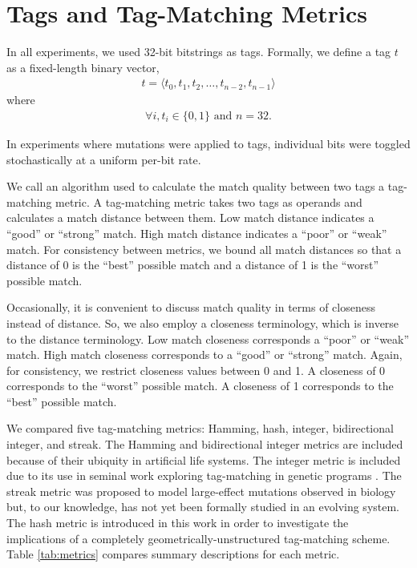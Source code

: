 \section{Tags and Tag-Matching Metrics}

In all experiments, we used 32-bit bitstrings as tags.
Formally, we define a tag $t$ as a fixed-length binary vector,
\begin{align*}
t = \langle t_0, t_1, t_2, \dots, t_{n-2}, t_{n-1} \rangle
\end{align*}
where
\begin{align*}
\forall i, t_i \in \{0, 1\} \text{ and } n=32.
\end{align*}

In experiments where mutations were applied to tags, individual bits were toggled stochastically at a uniform per-bit rate.

We call an algorithm used to calculate the match quality between two tags a tag-matching metric.
A tag-matching metric takes two tags as operands and calculates a match distance between them.
Low match distance indicates a ``good'' or ``strong'' match.
High match distance indicates a ``poor'' or ``weak'' match.
For consistency between metrics, we bound all match distances so that a distance of 0 is the ``best'' possible match and a distance of 1 is the ``worst'' possible match.

Occasionally, it is convenient to discuss match quality in terms of closeness instead of distance.
So, we also employ a closeness terminology, which is inverse to the distance terminology.
Low match closeness corresponds a ``poor'' or ``weak'' match.
High match closeness corresponds to a ``good'' or ``strong'' match.
Again, for consistency, we restrict closeness values between 0 and 1.
A closeness of 0 corresponds to the ``worst'' possible match.
A closeness of 1 corresponds to the ``best'' possible match.



We compared five tag-matching metrics: Hamming, hash, integer, bidirectional integer, and streak.
The Hamming and bidirectional integer metrics are included because of their ubiquity in artificial life systems.
The integer metric is included due to its use in seminal work exploring tag-matching in genetic programs \citep{spector2011tag, spector2011s,spector2012tag}.
The streak metric was proposed to model large-effect mutations observed in biology but, to our knowledge, has not yet been formally studied in an evolving system.
The hash metric is introduced in this work in order to investigate the implications of a completely geometrically-unstructured tag-matching scheme.
Table \ref{tab:metrics} compares summary descriptions for each metric.

